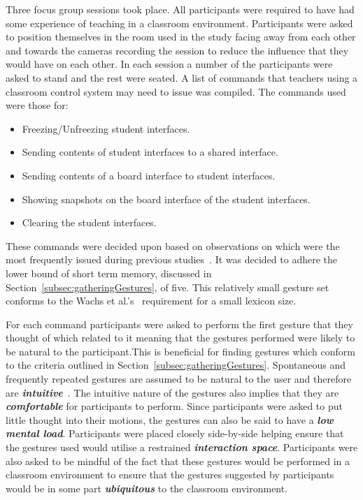 \documentclass[link]{IWCOMP}
\begin{document}
Three focus group sessions took place.
All participants were required to have had some experience of teaching in a classroom environment.
Participants were asked to position themselves in the room used in the study facing away from each other and towards the cameras recording the session to reduce the influence that they would have on each other.
In each session a number of the participants were asked to stand and the rest were seated.
A list of commands that teachers using a classroom control system may need to issue was compiled.
The commands used were those for: 
\begin{itemize}
\item Freezing/Unfreezing student interfaces.
\item Sending contents of student interfaces to a shared interface.
\item Sending contents of a board interface to student interfaces.
\item Showing snapshots on the board interface of the student interfaces.
\item Clearing the student interfaces.\\
\end{itemize}

These commands were decided upon based on observations on which were the most frequently issued during previous studies~\cite{Hatch2011}.
It was decided to adhere the lower bound of short term memory, discussed in Section~\ref{subsec:gatheringGestures}, of five.
This relatively small gesture set conforms to the Wachs et al.'s~\citeyearpar{Wachs2011} requirement for a small lexicon size.

For each command participants were asked to perform the first gesture that they thought of which related to it meaning  that the gestures performed were likely to be natural to the participant.This is beneficial for finding gestures which conform to the criteria outlined in Section~\ref{subsec:gatheringGestures}.
Spontaneous and frequently repeated gestures are assumed to be natural to the user and therefore are \textit{\textbf{intuitive}}~\cite{Grandhi2011}.
The intuitive nature of the gestures also implies that they are \textit{\textbf{comfortable}} for participants to perform.
Since participants were asked to put little thought into their motions, the gestures can also be said to have a \textit{\textbf{low mental load}}.
Participants were placed closely side-by-side helping ensure that the gestures used would utilise a restrained \textit{\textbf{interaction space}}.
Participants were also asked to be mindful of the fact that these gestures would be performed in a classroom environment to ensure that the gestures suggested by participants would be in some part \textit{\textbf{ubiquitous}} to the classroom environment.
\end{document}
